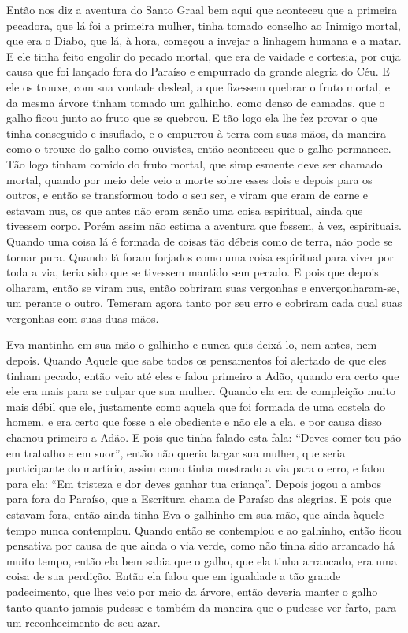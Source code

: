 Então nos diz a aventura do Santo Graal bem aqui que aconteceu que a primeira
pecadora, que lá foi a primeira mulher, tinha tomado conselho ao Inimigo
mortal, que era o Diabo, que lá, à hora, começou a invejar a linhagem humana e
a matar. E ele tinha feito engolir do pecado mortal, que era de vaidade e
cortesia, por cuja causa que foi lançado fora do Paraíso e empurrado da grande
alegria do Céu. E ele os trouxe, com sua vontade desleal, a que fizessem
quebrar o fruto mortal, e da mesma árvore tinham tomado um galhinho, como denso
de camadas, que o galho ficou junto ao fruto que se quebrou. E tão logo ela lhe
fez provar o que tinha conseguido e insuflado, e o empurrou à terra com suas
mãos, da maneira como o trouxe do galho como ouvistes, então aconteceu que o
galho permanece. Tão logo tinham comido do fruto mortal, que simplesmente deve
ser chamado mortal, quando por meio dele veio a morte sobre esses dois e depois
para os outros, e então se transformou todo o seu ser, e viram que eram de
carne e estavam nus, os que antes não eram senão uma coisa espiritual, ainda
que tivessem corpo. Porém assim não estima a aventura que fossem, à vez,
espirituais. Quando uma coisa lá é formada de coisas tão débeis como de terra, não
pode se tornar pura. Quando lá foram forjados como uma coisa espiritual para
viver por toda a via, teria sido que se tivessem mantido sem pecado. E pois que
depois olharam, então se viram nus, então cobriram suas vergonhas e
envergonharam-se, um perante o outro. Temeram agora tanto por seu erro e
cobriram cada qual suas vergonhas com suas duas mãos.

Eva mantinha em sua mão o galhinho e nunca quis deixá-lo, nem antes, nem depois.
Quando Aquele que sabe todos os pensamentos foi alertado de que eles tinham
pecado, então veio até eles e falou primeiro a Adão, quando era certo que ele
era mais para se culpar que sua mulher. Quando ela era de compleição muito mais
débil que ele, justamente como aquela que foi formada de uma costela do homem,
e era certo que fosse a ele obediente e não ele a ela, e por causa disso chamou
primeiro a Adão. E pois que tinha falado esta fala: “Deves comer teu pão em
trabalho e em suor”, então não queria largar sua mulher, que seria participante
do martírio, assim como tinha mostrado a via para o erro, e falou para ela: “Em
tristeza e dor deves ganhar tua criança”. Depois jogou a ambos para fora do
Paraíso, que a Escritura chama de Paraíso das alegrias. E pois que estavam
fora, então ainda tinha Eva o galhinho em sua mão, que ainda àquele tempo nunca
contemplou. Quando então se contemplou e ao galhinho, então ficou pensativa por
causa de que ainda o via verde, como não tinha sido arrancado há muito tempo,
então ela bem sabia que o galho, que ela tinha arrancado, era uma coisa de sua
perdição. Então ela falou que em igualdade a tão grande padecimento, que lhes
veio por meio da árvore, então deveria manter o galho tanto quanto jamais
pudesse e também da maneira que o pudesse ver farto, para um reconhecimento de
seu azar.

